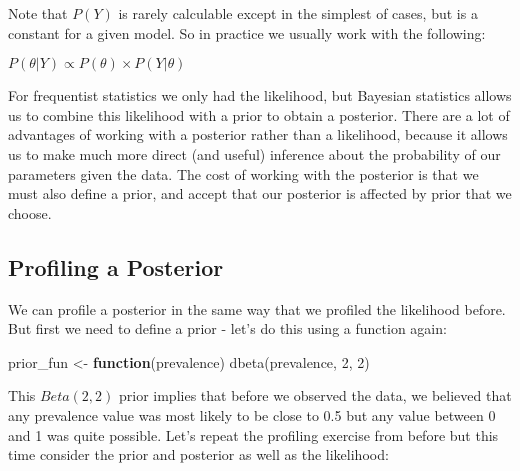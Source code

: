 \documentclass[
  12pt,
]{article}
\newenvironment{Shaded}{\begin{snugshade}}{\end{snugshade}}
\newcommand{\ControlFlowTok}[1]{\textcolor[rgb]{0.13,0.29,0.53}{\textbf{#1}}}
\newcommand{\DecValTok}[1]{\textcolor[rgb]{0.00,0.00,0.81}{#1}}
\newcommand{\FunctionTok}[1]{\textcolor[rgb]{0.00,0.00,0.00}{#1}}
\newcommand{\NormalTok}[1]{#1}
\newcommand{\OtherTok}[1]{\textcolor[rgb]{0.56,0.35,0.01}{#1}}
\begin{document}
Note that \(P(Y)\) is rarely calculable except in the simplest of cases,
but is a constant for a given model. So in practice we usually work with
the following:

\(P(\theta|Y) \propto P(\theta)\times P(Y|\theta)\)

For frequentist statistics we only had the likelihood, but Bayesian
statistics allows us to combine this likelihood with a prior to obtain a
posterior. There are a lot of advantages of working with a posterior
rather than a likelihood, because it allows us to make much more direct
(and useful) inference about the probability of our parameters given the
data. The cost of working with the posterior is that we must also define
a prior, and accept that our posterior is affected by prior that we
choose.

\hypertarget{profiling-a-posterior}{%
\subsection{Profiling a Posterior}\label{profiling-a-posterior}}

We can profile a posterior in the same way that we profiled the
likelihood before. But first we need to define a prior - let's do this
using a function again:

\begin{Shaded}
\begin{Highlighting}[]
\NormalTok{prior\_fun }\OtherTok{\textless{}{-}} \ControlFlowTok{function}\NormalTok{(prevalence) }\FunctionTok{dbeta}\NormalTok{(prevalence, }\DecValTok{2}\NormalTok{, }\DecValTok{2}\NormalTok{)}
\end{Highlighting}
\end{Shaded}

This \(Beta(2,2)\) prior implies that before we observed the data, we
believed that any prevalence value was most likely to be close to 0.5
but any value between 0 and 1 was quite possible. Let's repeat the
profiling exercise from before but this time consider the prior and
posterior as well as the likelihood:
\end{document}

